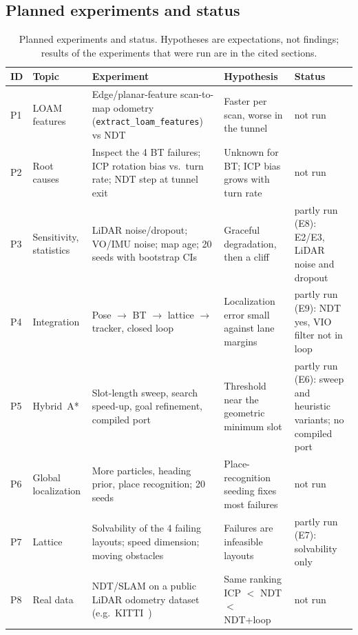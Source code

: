 \documentclass[11pt,a4paper]{article}
\begin{document}
\subsection{Planned experiments and status}\label{sec:plan}
\begin{table}[H]\centering\small
\caption{Planned experiments and status. Hypotheses are expectations, not findings; results of the experiments that were run are in the cited sections.}
\begin{tabular}{@{}l>{\raggedright}p{2.2cm}>{\raggedright}p{4.6cm}>{\raggedright}p{3.0cm}>{\raggedright\arraybackslash}p{3.1cm}@{}}\toprule
ID & Topic & Experiment & Hypothesis & Status\\\midrule
P1 & LOAM features & Edge/planar-feature scan-to-map odometry (\texttt{extract\_loam\_features}) vs NDT & Faster per scan, worse in the tunnel & not run\\
P2 & Root causes & Inspect the 4 BT failures; ICP rotation bias vs.\ turn rate; NDT step at tunnel exit & Unknown for BT; ICP bias grows with turn rate & not run\\
P3 & Sensitivity, statistics & LiDAR noise/dropout; VO/IMU noise; map age; 20 seeds with bootstrap CIs & Graceful degradation, then a cliff & partly run (E8): E2/E3, LiDAR noise and dropout\\
P4 & Integration & Pose $\to$ BT $\to$ lattice $\to$ tracker, closed loop & Localization error small against lane margins & partly run (E9): NDT yes, VIO filter not in loop\\
P5 & Hybrid~A* & Slot-length sweep, search speed-up, goal refinement, compiled port & Threshold near the geometric minimum slot & partly run (E6): sweep and heuristic variants; no compiled port\\
P6 & Global localization & More particles, heading prior, place recognition; 20 seeds & Place-recognition seeding fixes most failures & not run\\
P7 & Lattice & Solvability of the 4 failing layouts; speed dimension; moving obstacles & Failures are infeasible layouts & partly run (E7): solvability only\\
P8 & Real data & NDT/SLAM on a public LiDAR odometry dataset (e.g.\ KITTI~\cite{geiger12}) & Same ranking ICP $<$ NDT $<$ NDT+loop & not run\\\bottomrule
\end{tabular}\end{table}
\end{document}
